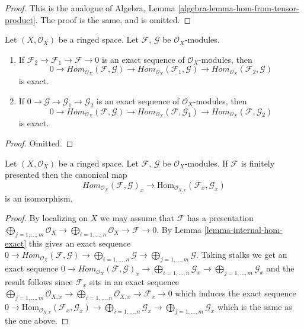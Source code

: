 \begin{proof}
This is the analogue of
Algebra, Lemma \ref{algebra-lemma-hom-from-tensor-product}.
The proof is the same, and is omitted.
\end{proof}

\begin{lemma}
\label{lemma-internal-hom-exact}
Let $(X, \mathcal{O}_X)$ be a ringed space.
Let $\mathcal{F}$, $\mathcal{G}$ be $\mathcal{O}_X$-modules.
\begin{enumerate}
\item If $\mathcal{F}_2 \to \mathcal{F}_1 \to \mathcal{F} \to 0$
is an exact sequence of $\mathcal{O}_X$-modules, then
$$
0 \to
\textit{Hom}_{\mathcal{O}_X}(\mathcal{F}, \mathcal{G}) \to
\textit{Hom}_{\mathcal{O}_X}(\mathcal{F}_1, \mathcal{G}) \to
\textit{Hom}_{\mathcal{O}_X}(\mathcal{F}_2, \mathcal{G})
$$
is exact.
\item If $0 \to \mathcal{G} \to \mathcal{G}_1 \to \mathcal{G}_2$
is an exact sequence of $\mathcal{O}_X$-modules, then
$$
0 \to
\textit{Hom}_{\mathcal{O}_X}(\mathcal{F}, \mathcal{G}) \to
\textit{Hom}_{\mathcal{O}_X}(\mathcal{F}, \mathcal{G}_1) \to
\textit{Hom}_{\mathcal{O}_X}(\mathcal{F}, \mathcal{G}_2)
$$
is exact.
\end{enumerate}
\end{lemma}

\begin{proof}
Omitted.
\end{proof}

\begin{lemma}
\label{lemma-stalk-internal-hom}
Let $(X, \mathcal{O}_X)$ be a ringed space.
Let $\mathcal{F}$, $\mathcal{G}$ be $\mathcal{O}_X$-modules.
If $\mathcal{F}$ is finitely presented then the canonical map
$$
\textit{Hom}_{\mathcal{O}_X}(\mathcal{F}, \mathcal{G})_x
\to
\text{Hom}_{\mathcal{O}_{X, x}}(\mathcal{F}_x, \mathcal{G}_x)
$$
is an isomorphism.
\end{lemma}

\begin{proof}
By localizing on $X$ we may assume that $\mathcal{F}$ has a presentation
$
\bigoplus\nolimits_{j = 1, \ldots, m}
\mathcal{O}_X
\longrightarrow
\bigoplus\nolimits_{i = 1, \ldots, n}
\mathcal{O}_X
\to
\mathcal{F}
\to
0.
$
By Lemma \ref{lemma-internal-hom-exact} this gives an exact sequence
$
0 \to
\textit{Hom}_{\mathcal{O}_X}(\mathcal{F}, \mathcal{G}) \to
\bigoplus\nolimits_{i = 1, \ldots, n} \mathcal{G}
\longrightarrow
\bigoplus\nolimits_{j = 1, \ldots, m} \mathcal{G}.
$
Taking stalks we get an exact sequence
$
0 \to
\textit{Hom}_{\mathcal{O}_X}(\mathcal{F}, \mathcal{G})_x \to
\bigoplus\nolimits_{i = 1, \ldots, n} \mathcal{G}_x
\longrightarrow
\bigoplus\nolimits_{j = 1, \ldots, m} \mathcal{G}_x
$
and the result follows since $\mathcal{F}_x$ sits in
an exact sequence
$
\bigoplus\nolimits_{j = 1, \ldots, m}
\mathcal{O}_{X, x}
\longrightarrow
\bigoplus\nolimits_{i = 1, \ldots, n}
\mathcal{O}_{X, x}
\to
\mathcal{F}_x
\to
0
$
which induces the exact sequence
$
0 \to
\text{Hom}_{\mathcal{O}_{X, x}}(\mathcal{F}_x, \mathcal{G}_x) \to
\bigoplus\nolimits_{i = 1, \ldots, n} \mathcal{G}_x
\longrightarrow
\bigoplus\nolimits_{j = 1, \ldots, m} \mathcal{G}_x
$
which is the same as the one above.
\end{proof}

